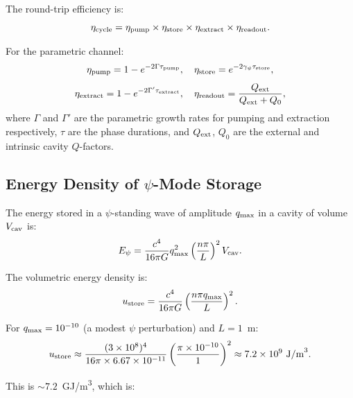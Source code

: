\documentclass[aps,prd,twocolumn,showpacs,preprintnumbers,superscriptaddress,nofootinbib]{revtex4-2}
\begin{document}
The round-trip efficiency is:
\begin{equation}\label{eq:round-trip}
\eta_{\rm cycle} = \eta_{\rm pump}\times\eta_{\rm store}\times\eta_{\rm extract}\times\eta_{\rm readout}.
\end{equation}

For the parametric channel:
\begin{equation}
\eta_{\rm pump} = 1 - e^{-2\Gamma\tau_{\rm pump}}, \quad
\eta_{\rm store} = e^{-2\gamma_\psi\tau_{\rm store}},
\end{equation}
\begin{equation}
\eta_{\rm extract} = 1 - e^{-2\Gamma'\tau_{\rm extract}}, \quad
\eta_{\rm readout} = \frac{Q_{\rm ext}}{Q_{\rm ext}+Q_0},
\end{equation}
where $\Gamma$ and $\Gamma'$ are the parametric growth rates for pumping
and extraction respectively, $\tau$ are the phase durations, and
$Q_{\rm ext}$, $Q_0$ are the external and intrinsic cavity $Q$-factors.

\subsection{Energy Density of $\psi$-Mode Storage}\label{sec:storage-density}

The energy stored in a $\psi$-standing wave of amplitude $q_{\rm max}$ in
a cavity of volume $V_{\rm cav}$ is:
\begin{equation}\label{eq:stored-energy}
E_\psi = \frac{c^4}{16\pi G}q_{\rm max}^2\left(\frac{n\pi}{L}\right)^2 V_{\rm cav}.
\end{equation}

The volumetric energy density is:
\begin{equation}\label{eq:storage-density}
u_{\rm store} = \frac{c^4}{16\pi G}\left(\frac{n\pi q_{\rm max}}{L}\right)^2.
\end{equation}

For $q_{\rm max} = 10^{-10}$ (a modest $\psi$ perturbation) and
$L = 1$~m:
\begin{equation}
u_{\rm store} \approx \frac{(3\times 10^8)^4}{16\pi\times 6.67\times 10^{-11}}\left(\frac{\pi\times 10^{-10}}{1}\right)^2 \approx 7.2\times 10^9~\text{J/m}^3.
\end{equation}

This is $\sim 7.2$~\si{GJ/m^3}, which is:
\end{document}
